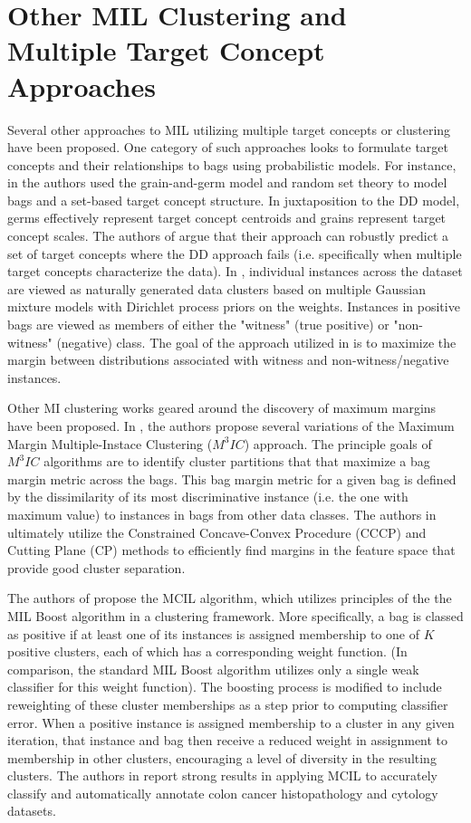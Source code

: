 \documentclass[12pt,dvips]{report}
\numberwithin{equation}{section}
\begin{document}
\section{Other MIL Clustering and Multiple Target Concept Approaches} \label{sec:RelatedWork_ClusteringTC}

Several other approaches to MIL utilizing multiple target concepts or clustering have been proposed.  One category of such approaches looks to formulate target concepts and their relationships to bags using probabilistic models. For instance, in \cite{bolt11} the authors used the grain-and-germ model and random set theory to model bags and a set-based target concept structure.  In juxtaposition to the DD model, germs effectively represent target concept centroids and grains represent target concept scales.  The authors of \cite{bolt11} argue that their approach can robustly predict a set of target concepts where the DD approach fails (i.e. specifically when multiple target concepts characterize the data).  In \cite{kand14}, individual instances across the dataset are viewed as naturally generated data clusters based on multiple Gaussian mixture models with Dirichlet process priors on the weights.  Instances in positive bags are viewed as members of either the "witness" (true positive) or "non-witness" (negative) class.  The goal of the approach utilized in \cite{kand14} is to maximize the margin between distributions associated with witness and non-witness/negative instances.

Other MI clustering works geared around the discovery of maximum margins have been proposed.  In \cite{ijca09}, the authors propose several variations of the Maximum Margin Multiple-Instace Clustering ($M^3IC$) approach.  The principle goals of $M^3IC$ algorithms are to identify cluster partitions that that maximize a bag margin metric across the bags.  This bag margin metric for a given bag is defined by the dissimilarity of its most discriminative instance (i.e. the one with maximum value) to instances in bags from other data classes.   The authors in \cite{ijca09} ultimately utilize the Constrained Concave-Convex Procedure (CCCP) and Cutting Plane (CP) methods to efficiently find margins in the feature space that provide good cluster separation.

The authors of \cite{mcil14} propose the MCIL algorithm, which utilizes principles of the the MIL Boost algorithm \cite{zhan06} in a clustering framework.  More specifically, a bag is classed as positive if at least one of its instances is assigned membership to one of $K$ positive clusters, each of which has a corresponding weight function.  (In comparison, the standard MIL Boost algorithm utilizes only a single weak classifier for this weight function).  The boosting process is modified to include reweighting of these cluster memberships as a step prior to computing classifier error.  When a positive instance is assigned membership to a cluster in any given iteration, that instance and bag then receive a reduced weight in assignment to membership in other clusters, encouraging a level of diversity in the resulting clusters.  The authors in \cite{mcil14} report strong results in applying MCIL to accurately classify and automatically annotate colon cancer histopathology and cytology datasets.
\end{document}
